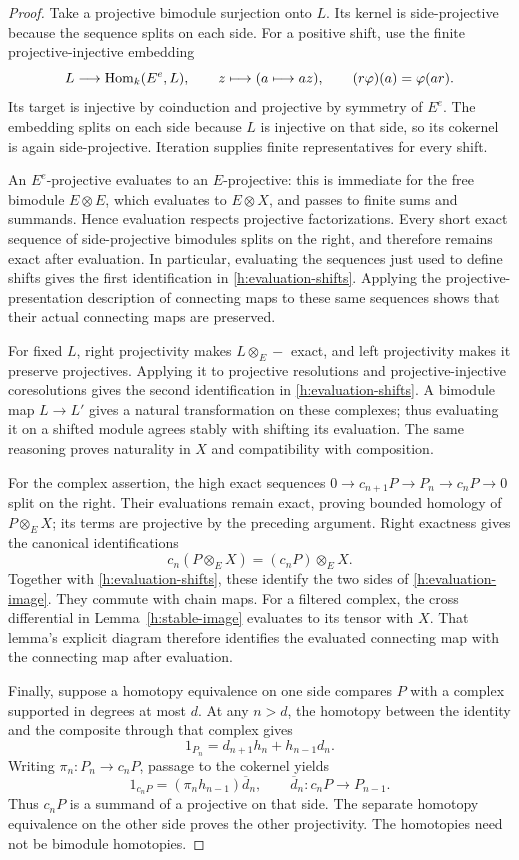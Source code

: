 \begin{proof}
Take a projective bimodule surjection onto $L$. Its kernel is
side-projective because the sequence splits on each side. For a positive
shift, use the finite projective-injective embedding
\[
 L\longrightarrow\operatorname{Hom}_k(E^e,L),\qquad
 z\longmapsto(a\longmapsto az),
 \qquad (r\varphi)(a)=\varphi(ar).
\]
Its target is injective by coinduction and projective by symmetry of
$E^e$. The embedding splits on each side because $L$ is injective on
that side, so its cokernel is again side-projective. Iteration supplies
finite representatives for every shift.

An $E^e$-projective evaluates to an $E$-projective: this is immediate for
the free bimodule $E\otimes E$, which evaluates to $E\otimes X$, and
passes to finite sums and summands. Hence evaluation respects projective
factorizations. Every short exact sequence of side-projective bimodules
splits on the right, and therefore remains exact after evaluation. In
particular, evaluating the sequences just used to define shifts gives
the first identification in \eqref{h:evaluation-shifts}. Applying the
projective-presentation description of connecting maps to these same
sequences shows that their actual connecting maps are preserved.

For fixed $L$, right projectivity makes $L\otimes_E-$ exact, and left
projectivity makes it preserve projectives. Applying it to projective
resolutions and projective-injective coresolutions gives the second
identification in \eqref{h:evaluation-shifts}. A bimodule map $L\to L'$
gives a natural transformation on these complexes; thus evaluating it
on a shifted module agrees stably with shifting its evaluation. The
same reasoning proves naturality in $X$ and compatibility with
composition.

For the complex assertion, the high exact sequences
$0\to c_{n+1}P\to P_n\to c_nP\to0$ split on the right. Their evaluations
remain exact, proving bounded homology of $P\otimes_EX$; its terms are
projective by the preceding argument. Right exactness gives the
canonical identifications
\[
 c_n(P\otimes_EX)=(c_nP)\otimes_EX.
\]
Together with \eqref{h:evaluation-shifts}, these identify the two sides
of \eqref{h:evaluation-image}. They commute with chain maps. For a
filtered complex, the cross differential in
Lemma~\ref{h:stable-image} evaluates to its tensor with $X$. That lemma's
explicit diagram therefore identifies the evaluated connecting map with
the connecting map after evaluation.

Finally, suppose a homotopy equivalence on one side compares $P$ with a
complex supported in degrees at most $d$. At any $n>d$, the homotopy
between the identity and the composite through that complex gives
\[
 1_{P_n}=d_{n+1}h_n+h_{n-1}d_n.
\]
Writing $\pi_n:P_n\to c_nP$, passage to the cokernel yields
\[
 1_{c_nP}=(\pi_nh_{n-1})\overline d_n,
 \qquad \overline d_n:c_nP\longrightarrow P_{n-1}.
\]
Thus $c_nP$ is a summand of a projective on that side. The separate
homotopy equivalence on the other side proves the other projectivity.
The homotopies need not be bimodule homotopies.
\end{proof}
